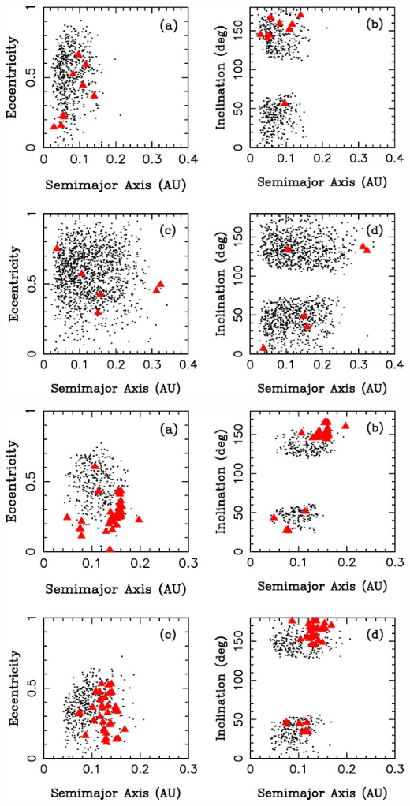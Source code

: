 \documentclass[10pt,a4paper,twoside]{article}
\renewenvironment{figure}{}{}
\begin{document}
\begin{figure}[tbn]
\includegraphics[scale=1]{img/Nesvorny2007-5.jpg}
\caption{•}
\end{figure}
\begin{figure}[tbn]
\includegraphics[scale=1]{img/Nesvorny2007-7.jpg}
\caption{•}
\end{figure}
\end{document}
